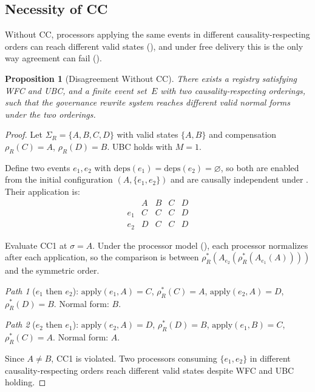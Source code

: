 \documentclass[11pt,a4paper]{article}
\theoremstyle{plain}
\newtheorem{proposition}[theorem]{Proposition}
\theoremstyle{definition}
\theoremstyle{remark}
\renewcommand{\_}{\textunderscore\allowbreak}
\begin{document}
\subsection{Necessity of CC}

Without CC, processors applying the same events in different
causality-respecting orders can reach different valid states
(), and under free delivery this is the only way
agreement can fail ().

\begin{proposition}[Disagreement Without CC]
\label{prop:cc-necessary}
There exists a registry satisfying WFC and UBC, and a finite event set~$E$
with two causality-respecting orderings, such that the governance rewrite
system reaches different valid normal forms under the two orderings.
\end{proposition}

\begin{proof}
Let $\Sigma_R = \{A, B, C, D\}$ with valid states $\{A, B\}$ and
compensation $\rho_R(C) = A$, $\rho_R(D) = B$.  UBC holds with $M = 1$.

Define two events $e_1, e_2$ with $\mathrm{deps}(e_1) = \mathrm{deps}(e_2) =
\varnothing$, so both are enabled from the initial configuration
$(A, \{e_1, e_2\})$ and are causally independent under
.  Their application is:
\[
\begin{array}{c|cccc}
  & A & B & C & D \\ \hline
e_1 & C & C & C & D \\
e_2 & D & C & C & D
\end{array}
\]

Evaluate CC1 at $\sigma = A$.  Under the processor model
(), each processor normalizes after each application,
so the comparison is between $\rho_R^*(A_{e_2}(\rho_R^*(A_{e_1}(A))))$ and
the symmetric order.

\emph{Path 1} ($e_1$ then $e_2$): $\mathrm{apply}(e_1, A) = C$,
$\rho_R^*(C) = A$, $\mathrm{apply}(e_2, A) = D$, $\rho_R^*(D) = B$.
Normal form: $B$.

\emph{Path 2} ($e_2$ then $e_1$): $\mathrm{apply}(e_2, A) = D$,
$\rho_R^*(D) = B$, $\mathrm{apply}(e_1, B) = C$, $\rho_R^*(C) = A$.
Normal form: $A$.

Since $A \neq B$, CC1 is violated.  Two processors consuming
$\{e_1, e_2\}$ in different causality-respecting orders reach different valid
states despite WFC and UBC holding.
\end{proof}
\end{document}
